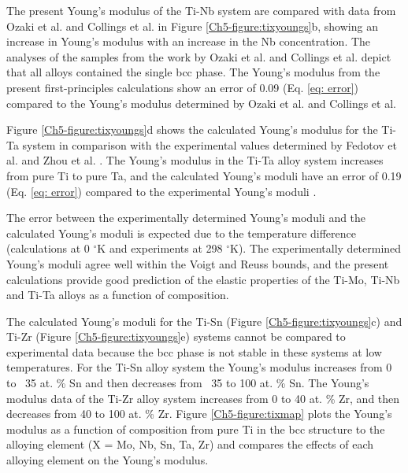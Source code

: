The present Young's modulus of the Ti-Nb system are compared with data from Ozaki et al. \cite{Ozaki2004} and Collings et al. \cite{Boyer1994} in Figure \ref{Ch5-figure:tixyoungs}b, showing an increase in Young's modulus with an increase in the Nb concentration. The analyses of the samples from the work by Ozaki et al. and Collings et al. depict that all alloys contained the single bcc phase. The Young's modulus from the present first-principles calculations show an error of 0.09 (Eq. \ref{eq: error}) compared to the Young's modulus determined by Ozaki et al. and Collings et al. 

Figure \ref{Ch5-figure:tixyoungs}d shows the calculated Young's modulus for the Ti-Ta system in comparison with the experimental values determined by Fedotov et al. \cite{Fedotov1985} and Zhou et al. \cite{Zhou2004a,Zhou2009a}. The Young's modulus in the Ti-Ta alloy system increases from pure Ti to pure Ta, and the calculated Young's moduli have an error of 0.19 (Eq. \ref{eq: error}) compared to the experimental Young’s moduli \cite{Fedotov1985,Zhou2004a,Zhou2009a}.  

The error between the experimentally determined Young's moduli and the calculated Young's moduli is expected due to the temperature difference (calculations at 0 $^\circ$K and experiments at 298 $^\circ$K). The experimentally determined Young's moduli agree well within the Voigt and Reuss bounds, and the present calculations provide good prediction of the elastic properties of the Ti-Mo, Ti-Nb and Ti-Ta alloys as a function of composition.

The calculated Young's moduli for the Ti-Sn (Figure \ref{Ch5-figure:tixyoungs}c) and Ti-Zr (Figure \ref{Ch5-figure:tixyoungs}e) systems cannot be compared to experimental data because the bcc phase is not stable in these systems at low temperatures. For the Ti-Sn alloy system the Young's modulus increases from 0 to ~35 at. \% Sn and then decreases from ~35 to 100 at. \% Sn. The Young's modulus data of the Ti-Zr alloy system increases from 0 to 40 at. \% Zr, and then decreases from 40 to 100 at. \% Zr. Figure \ref{Ch5-figure:tixmap} plots the Young's modulus as a function of composition from pure Ti in the bcc structure to the alloying element (X = Mo, Nb, Sn, Ta, Zr) and compares the effects of each alloying element on the Young's modulus.

